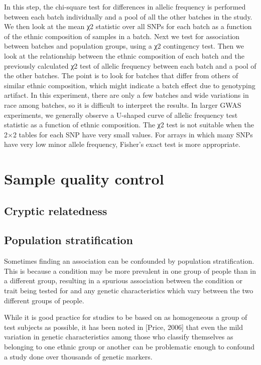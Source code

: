 \documentclass[]{book}
\theoremstyle{definition}
\theoremstyle{definition}
\theoremstyle{definition}
\theoremstyle{remark}
\begin{document}
In this step, the chi-square test for diﬀerences in allelic frequency is
performed between each batch individually and a pool of all the other
batches in the study. We then look at the mean χ2 statistic over all
SNPs for each batch as a function of the ethnic composition of samples
in a batch. Next we test for association between batches and population
groups, using a χ2 contingency test. Then we look at the relationship
between the ethnic composition of each batch and the previously
calculated χ2 test of allelic frequency between each batch and a pool of
the other batches. The point is to look for batches that diﬀer from
others of similar ethnic composition, which might indicate a batch eﬀect
due to genotyping artifact. In this experiment, there are only a few
batches and wide variations in race among batches, so it is diﬃcult to
interpret the results. In larger GWAS experiments, we generally observe
a U-shaped curve of allelic frequency test statistic as a function of
ethnic composition. The χ2 test is not suitable when the 2×2 tables for
each SNP have very small values. For arrays in which many SNPs have very
low minor allele frequency, Fisher's exact test is more appropriate.

\section{Sample quality control}\label{sample-quality-control}

\subsection{Cryptic relatedness}\label{cryptic-relatedness}

\subsection{Population stratification}\label{population-stratification}

Sometimes finding an association can be confounded by population
stratification. This is because a condition may be more prevalent in one
group of people than in a different group, resulting in a spurious
association between the condition or trait being tested for and any
genetic characteristics which vary between the two different groups of
people.

While it is good practice for studies to be based on as homogeneous a
group of test subjects as possible, it has been noted in {[}Price,
2006{]} that even the mild variation in genetic characteristics among
those who classify themselves as belonging to one ethnic group or
another can be problematic enough to confound a study done over
thousands of genetic markers.
\end{document}

